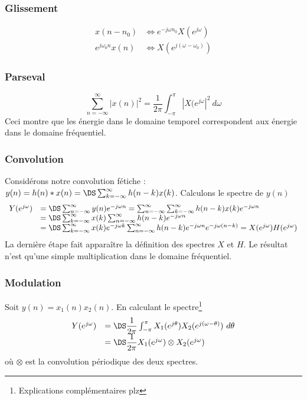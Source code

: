 		\subsubsection{Glissement}
		\begin{equation}
		\begin{array}{ll}
		x(n-n_0) &\Leftrightarrow e^{-j\omega n_0}X(e^{j\omega})\\
		e^{j\omega_0n}x(n) &\Leftrightarrow X\left(e^{j(\omega-\omega_0)}\right)
		\end{array}		
		\end{equation}


		\subsubsection{Parseval}
		\begin{equation}
		\sum_{n=-\infty}^\infty |x(n)|^2 = \dfrac{1}{2\pi}\int_{-\pi}^\pi \left|X(e^{j\omega}\right|^2\ 
		d\omega
		\end{equation}
		Ceci montre que les énergie dans le domaine temporel correspondent aux énergie dans le 
		domaine fréquentiel. 
		
		\subsubsection{Convolution}
		Considérons notre convolution fétiche : $y(n) = h(n)*x(n) = \DS \sum_{k=-\infty}^\infty 
		h(n-k)x(k)$. Calculons le spectre de $y(n)$
		\begin{equation}
		\begin{array}{ll}
		Y(e^{j\omega}) &= \DS \sum_{n=-\infty}^\infty y(n)e^{-j\omega n} = \sum_{n=-\infty}^\infty
		\sum_{k=-\infty}^\infty h(n-k)x(k)e^{-j\omega n}\\
		&= \DS\sum_{k=-\infty}^\infty x(k) \sum_{n=-\infty}^\infty h(n-k)e^{-j\omega n}\\
		&= \DS \sum_{k=-\infty}^\infty x(k)e^{-j\omega k} \sum_{n=-\infty}^\infty h(n-k)e^{-j\omega n}
		e^{-j\omega(n-k)} = X(e^{j\omega})H(e^{j\omega})
		\end{array}
		\end{equation}
		La dernière étape fait apparaître la définition des spectres $X$ et $H$. Le résultat 
		n'est qu'une simple multiplication dans le domaine fréquentiel.
		
		\subsubsection{Modulation}
		Soit $y(n) = x_1(n)x_2(n)$. En calculant le spectre\footnote{Explications complémentaires plz}
		\begin{equation}
		\begin{array}{ll}
		Y(e^{j\omega}) &= \DS \dfrac{1}{2\pi}\int_{-\pi}^\pi X_1(e^{j\theta})X_2(e^{j(\omega-\theta)})\ 
		d\theta\\
		&= \DS \dfrac{1}{2\pi}X_1(e^{j\omega}) \otimes X_2(e^{j\omega})
		\end{array}
		\end{equation}
		où $\otimes$ est la convolution périodique des deux spectres.


